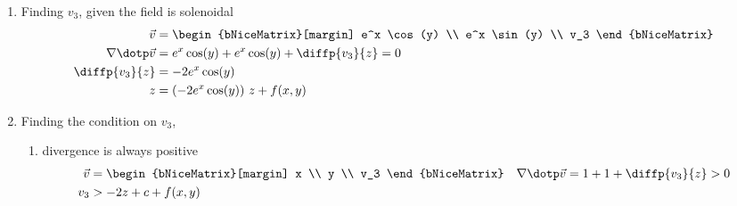 \begin{enumerate}
    \item Finding $ v_3 $, given the field is solenoidal
          \begin{align}
              \vec{v}              & = \begin{bNiceMatrix}[margin]
                                           e^x \cos(y) \\ e^x \sin(y) \\ v_3
                                       \end{bNiceMatrix}                \\
              \nabla \dotp \vec{v} & = e^x \cos(y) + e^x \cos(y) + \diffp {v_3}{z} = 0 \\
              \diffp{v_3}{z}       & = -2e^x \cos(y)                                   \\
              z                    & = (-2e^x \cos(y))\ z + f(x, y)
          \end{align}

    \item Finding the condition on $ v_3 $,
          \begin{enumerate}
              \item divergence is always positive
                    \begin{align} \vec{v}                     & =
              \begin{bNiceMatrix}[margin]
                                      x \\ y \\ v_3
                                  \end{bNiceMatrix} &
              \nabla \dotp \vec{v}        & = 1 + 1 + \diffp{v_3}{z} > 0 \\
              v_3                         & > -2z + c + f(x, y)
                    \end{align}


\end{enumerate}
\end{enumerate}
